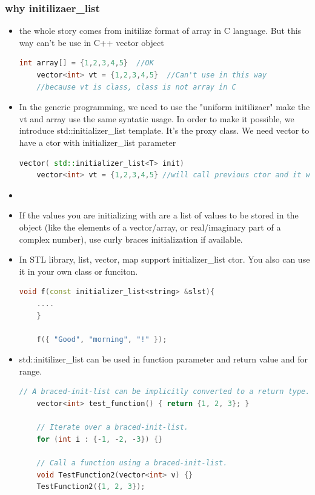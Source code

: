 \documentclass[a4paper,12pt,twoside]{book}
\begin{document}
\subsubsection{why initilizaer\_list}
\begin{itemize}
	\item the whole story comes from initilize format of array in C language. But this way can't be use in C++ vector object
	\begin{lstlisting}[frame=single, language=c++,mathescape=true]
	int array[] = {1,2,3,4,5}  //OK 
	vector<int> vt = {1,2,3,4,5}  //Can't use in this way
	//because vt is class, class is not array in C
	\end{lstlisting}
	
	\item In the generic programming, we need to use the "uniform initilizaer"  make the vt and array use the same syntatic usage. In order to make it possible, we introduce std::initializer\_list template. It's the proxy class. We need vector to have a ctor with initializer\_list parameter
	\begin{lstlisting}[frame=single, language=c++,mathescape=true]
	vector( std::initializer_list<T> init)
	vector<int> vt = {1,2,3,4,5} //will call previous ctor and it works. 
	\end{lstlisting}
	
		\item \item If the values you are initializing with are a list of values to be stored in the object (like the elements of a vector/array, or real/imaginary part of a complex number), use curly braces initialization if available.
	
	\item In STL library, list, vector, map support initializer\_list ctor. You also can use it in your own class or funciton.
	\begin{lstlisting}[frame=single, language=c++,mathescape=true]
	void f(const initializer_list<string> &slst){        
	....
	}
	
	f({ "Good", "morning", "!" });
	\end{lstlisting}
	
		\item std::initilizer\_list can be used in function parameter and return value and for range.  
	\begin{lstlisting}[frame=single, language=c++,mathescape=true]
	// A braced-init-list can be implicitly converted to a return type.
	vector<int> test_function() { return {1, 2, 3}; }
	
	// Iterate over a braced-init-list.
	for (int i : {-1, -2, -3}) {}
	
	// Call a function using a braced-init-list.
	void TestFunction2(vector<int> v) {}
	TestFunction2({1, 2, 3}); 
	\end{lstlisting}

\end{itemize}
\end{document}
